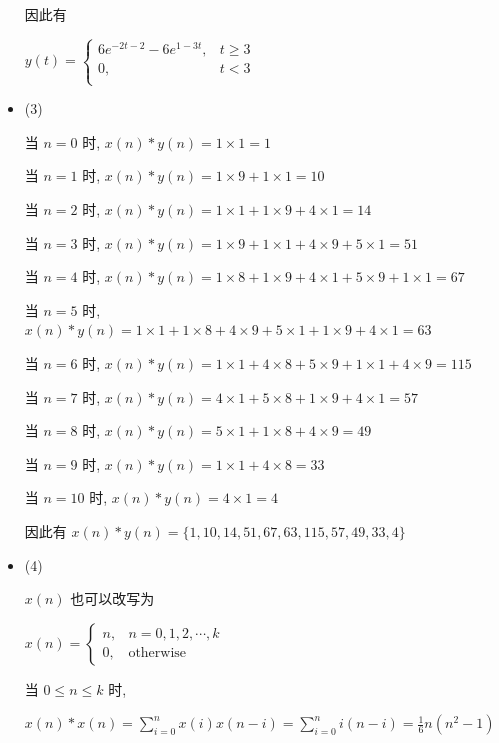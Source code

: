 \documentclass[a4paper,UTF8]{article}
\numberwithin{equation}{section}
\begin{document}
\begin{framed}
\begin{spacing}{1.5}
\begin{itemize}
      因此有
      
      $y(t) = \begin{cases}
          6 e^{- 2 t - 2} - 6 e^{1 - 3 t}, & t \ge 3 \\
          0, & t < 3 \\
      \end{cases}$
      
      \item (3)
      
      当 $n = 0$ 时, $x(n) * y(n) = 1 \times 1 = 1$
      
      当 $n = 1$ 时, $x(n) * y(n) = 1 \times 9 + 1 \times 1 = 10$
      
      当 $n = 2$ 时, $x(n) * y(n) = 1 \times 1 + 1 \times 9 + 4 \times 1 = 14$
      
      当 $n = 3$ 时, $x(n) * y(n) = 1 \times 9 + 1 \times 1 + 4 \times 9 + 5 \times 1 = 51$
      
      当 $n = 4$ 时, $x(n) * y(n) = 1 \times 8 + 1 \times 9 + 4 \times 1 + 5 \times 9 + 1 \times 1 = 67$
      
      当 $n = 5$ 时, $x(n) * y(n) = 1 \times 1 + 1 \times 8 + 4 \times 9 + 5 \times 1 + 1 \times 9 + 4 \times 1 = 63$
      
      当 $n = 6$ 时, $x(n) * y(n) = 1 \times 1 + 4 \times 8 + 5 \times 9 + 1 \times 1 + 4 \times 9 = 115$
      
      当 $n = 7$ 时, $x(n) * y(n) = 4 \times 1 + 5 \times 8 + 1 \times 9 + 4 \times 1 = 57$
      
      当 $n = 8$ 时, $x(n) * y(n) = 5 \times 1 + 1 \times 8 + 4 \times 9 = 49$
      
      当 $n = 9$ 时, $x(n) * y(n) = 1 \times 1 + 4 \times 8 = 33$
      
      当 $n = 10$ 时, $x(n) * y(n) = 4 \times 1 = 4$
      
      因此有 $x(n) * y(n) = \{ 1, 10, 14, 51, 67, 63, 115, 57, 49, 33, 4 \}$
      
      \item (4)
      
      $x(n)$ 也可以改写为
      
      $x(n) = \begin{cases}
          n, & n = 0, 1, 2, \cdots, k \\
          0, & \text{otherwise}
      \end{cases}$
      
      当 $0 \le n \le k$ 时,
      
      $\displaystyle x(n) * x(n) = \sum_{i=0}^{n}x(i)x(n-i) = \sum_{i=0}^{n}i(n-i) = \frac{1}{6}n (n^{2} - 1)$
      

\end{itemize}
\end{spacing}
\end{framed}
\end{document}

